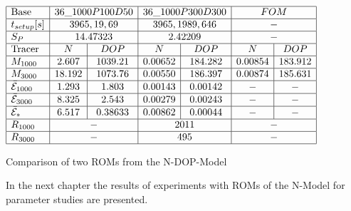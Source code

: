 \begin{table}[H]
\begin{center} 


 $\begin{array}{|l|c|c|c|c|c|c|}
 \hline
 
\text{Base}  & \multicolumn{2}{c|}{36\_1000P100D50} & \multicolumn{2}{c|}{36\_1000P300D300} & \multicolumn{2}{c|}{FOM}\\
\hline t_{setup} [s]  & \multicolumn{2}{c|}{3965,19,69} &\multicolumn{2}{c|}{3965,1989,646} & \multicolumn{2}{c|}{-}\\
\hline S_P  & \multicolumn{2}{c|}{14.47323} & \multicolumn{2}{c|}{2.42209}  & \multicolumn{2}{c|}{-} \\
\hline

\text{Tracer}  & N & DOP & N & DOP & N & DOP\\

\hline M_{1000}  & 2.607 & 1039.21  & 0.00652 & 184.282 & 0.00854 & 183.912\\

\hline M_{3000}  & 18.192 & 1073.76  & 0.00550 & 186.397 & 0.00874 & 185.631\\

\hline \bar{\mathcal{E}}_{1000}  & 1.293 & 1.803  & 0.00143 & 0.00142 & - & -\\

\hline \bar{\mathcal{E}}_{3000}  & 8.325 & 2.543  & 0.00279 & 0.00243 & - & -\\


\hline \bar{\mathcal{E}}_{*}  & 6.517 & 0.38633  & 0.00862 & 0.00044 & - & -\\

\hline R_{1000} &  \multicolumn{2}{c|}{-} &  \multicolumn{2}{c|}{2011} &  \multicolumn{2}{c|}{-} \\
\hline R_{3000} &  \multicolumn{2}{c|}{-} &  \multicolumn{2}{c|}{495} &  \multicolumn{2}{c|}{-} \\
\hline
\end{array}$


\end{center}
\caption{Comparison of two ROMs from the N-DOP-Model}
 \label{Chapter4:table-N-DOP}
\end{table}
In the next chapter the results of experiments with ROMs of the N-Model for parameter studies are presented.





